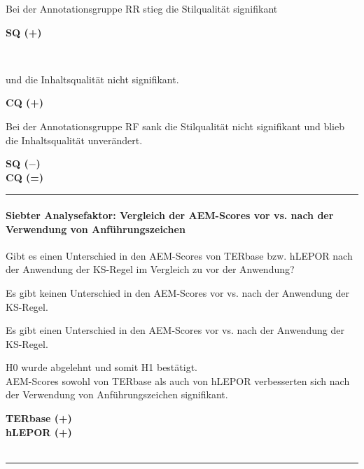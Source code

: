 \medskip
\noindent
\parbox[t]{.8\textwidth}{
Bei der Annotationsgruppe RR stieg die Stilqualität signifikant
}
\parbox[t]{.04\textwidth}{}
\colorbox{smGreen}{\parbox[t]{.15\textwidth}{
\textbf{SQ (+)}
}}\\
\noindent
\parbox[t]{.8\textwidth}{
und die Inhaltsqualität nicht signifikant.
}
\parbox[t]{.04\textwidth}{}
\parbox[t]{.15\textwidth}{
\textbf{CQ (+)}
}

\medskip
\noindent
\parbox[t]{.8\textwidth}{
Bei der Annotationsgruppe RF sank die Stilqualität nicht signifikant und blieb die Inhaltsqualität unverändert.
}
\parbox[t]{.04\textwidth}{}
\parbox[t]{.15\textwidth}{
\textbf{SQ ($-$)}\\
\textbf{CQ (=)}
}

\hrule
\paragraph*{Siebter Analysefaktor: Vergleich der AEM-Scores vor vs. nach der Verwendung von Anführungszeichen}
\begin{description}[font=\normalfont\bfseries]
\item [Fragestellung:] Gibt es einen Unterschied in den AEM-Scores von TERbase bzw. hLEPOR nach der Anwendung der KS-Regel im Vergleich zu vor der Anwendung?
\item [H0 --] Es gibt keinen Unterschied in den AEM-Scores vor vs. nach der Anwendung der KS-Regel.
\item [H1 --] Es gibt einen Unterschied in den AEM-Scores vor vs. nach der Anwendung der KS-Regel.
\item [Resultat]
\end{description}
\noindent
\parbox[t]{.75\textwidth}{
H0 wurde abgelehnt und somit H1 bestätigt.\\
AEM-Scores sowohl von TERbase als auch von hLEPOR verbesserten sich nach der Verwendung von Anführungszeichen signifikant.
}
\parbox[t]{.04\textwidth}{}
\colorbox{smGreen}{\parbox[t]{.2\textwidth}{
\textbf{TERbase (+)}\\
\textbf{hLEPOR (+)}\\
\\
}}

\hrule
